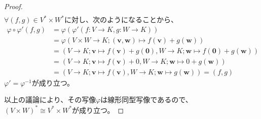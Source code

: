 \documentclass[dvipdfmx]{jsarticle}
\begin{document}
\begin{proof}
\begin{align*}
\end{align*}
$\forall(f,g) \in V^{*} \times W^{*}$に対し、次のようになることから、
\begin{align*}
\varphi \circ \varphi'(f,g) &= \varphi\left( \varphi'(f:V \rightarrow K,g:W \rightarrow K) \right)\\
&= \varphi\left( V \times W \rightarrow K;\left( \mathbf{v},\mathbf{w} \right) \mapsto f\left( \mathbf{v} \right) + g\left( \mathbf{w} \right) \right)\\
&= \left( V \rightarrow K;\mathbf{v} \mapsto f\left( \mathbf{v} \right) + g\left( \mathbf{0} \right),W \rightarrow K;\mathbf{w} \mapsto f\left( \mathbf{0} \right) + g\left( \mathbf{w} \right) \right)\\
&= \left( V \rightarrow K;\mathbf{v} \mapsto f\left( \mathbf{v} \right) + 0,W \rightarrow K;\mathbf{w} \mapsto 0 + g\left( \mathbf{w} \right) \right)\\
&= \left( V \rightarrow K;\mathbf{v} \mapsto f\left( \mathbf{v} \right),W \rightarrow K;\mathbf{w} \mapsto g\left( \mathbf{w} \right) \right) = (f,g)
\end{align*}
$\varphi' = \varphi^{- 1}$が成り立つ。\par
以上の議論により、その写像$\varphi$は線形同型写像であるので、$(V \times W)^{*} \cong V^{*} \times W^{*}$が成り立つ。
\end{proof}
\end{document}
